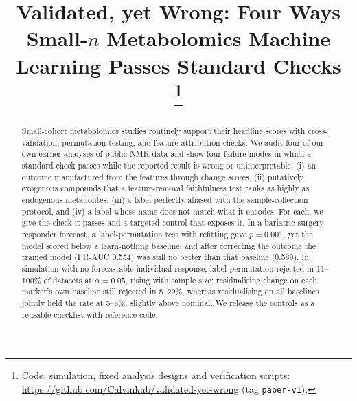\documentclass[conference]{IEEEtran}
\newcommand{\verified}[1]{#1}  %
\begin{document}
\title{Validated, yet Wrong: Four Ways Small-$n$ Metabolomics Machine Learning Passes Standard Checks\\
\thanks{Code, simulation, fixed analysis designs and verification scripts: \protect\url{https://github.com/Calvinkub/validated-yet-wrong} (tag \texttt{paper-v1}).}}

\author{
\and
{}
}

\maketitle

\begin{abstract}
Small-cohort metabolomics studies routinely support their headline scores with
cross-validation, permutation testing, and feature-attribution checks. We
audit four of our own earlier analyses of public NMR data and show four
failure modes in which a standard check passes while the reported result is
wrong or uninterpretable: (i) an outcome manufactured from the features
through change scores, (ii) putatively exogenous compounds that a
feature-removal faithfulness test ranks as highly as endogenous metabolites,
(iii) a label perfectly aliased with the sample-collection protocol, and
(iv) a label whose name does not match what it encodes. For each, we give the
check it passes and a targeted control that exposes it. In a bariatric-surgery
responder forecast, a label-permutation test with refitting gave
$p=\verified{0.001}$, yet the model scored below a learn-nothing baseline, and
after correcting the outcome the trained model (PR-AUC \verified{0.554}) was
still no better than that baseline (\verified{0.589}).
In simulation with no forecastable individual response, label permutation
rejected in 11--100\% of datasets at $\alpha=0.05$, rising with sample size;
residualising change on each marker's own baseline still rejected in
8--29\%, whereas residualising on all baselines jointly held the rate at
5--8\%, slightly above nominal. We release the controls as a reusable
checklist with reference code.
\end{abstract}
\end{document}
